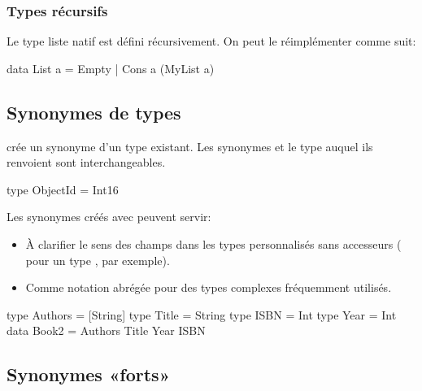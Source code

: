 \subsubsection{Types récursifs}

Le type liste natif est défini récursivement. On peut le réimplémenter comme suit:

\begin{haskellcode}
data List a = Empty | Cons a (MyList a)
\end{haskellcode}

\subsection{Synonymes de types}

 crée un synonyme d'un type existant. Les synonymes et le type auquel ils
renvoient sont interchangeables.

\begin{haskellcode}
type ObjectId = Int16
\end{haskellcode}

Les synonymes créés avec  peuvent servir:

\begin{itemize}
    \item À clarifier le sens des champs dans les types personnalisés sans accesseurs ( pour un type , par exemple).
    \item Comme notation abrégée pour des types complexes fréquemment utilisés.
\end{itemize}

\begin{haskellcode}
type Authors = [String]
type Title = String
type ISBN = Int
type Year = Int
data Book2 = Authors Title Year ISBN
\end{haskellcode}

\subsection{Synonymes «forts»}
